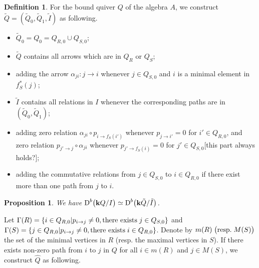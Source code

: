 \documentclass[a4paper, reqno]{amsart}
\newtheorem{prop}[thm]{Proposition}
\theoremstyle{definition}
\newtheorem{defn}[thm]{Definition}
\theoremstyle{remark}
\numberwithin{equation}{section}
\begin{document}
\begin{defn}\label{Def210}
For the bound quiver $Q$ of the algebra $A$, we construct $\tilde{Q}=(\tilde{Q}_0,\tilde{Q}_1,\tilde{I})$ as following.
\begin{itemize}
    \item $\tilde{Q}_0=Q_0=Q_{R,0}\cup Q_{S,0}$;
    \item $\tilde{Q}$ contains all arrows which are in $Q_R$ or $Q_S$;
    \item adding the arrow $\alpha_{ji} : j \to i $ whenever $j\in Q_{S,0}$ and $i$ is a minimal element in $f_S^{*}(j)$; 
    \item $\tilde{I}$ contains all relations in $I$ whenever the corresponding paths are in $(\tilde{Q}_0,\tilde{Q}_1)$;
    \item adding zero relation $\alpha_{ji}\circ p_{i\to f_S(i')}$ whenever $p_{j\to i'}=0$ for $i' \in Q_{R,0}$, and zero relation $p_{j'\to j}\circ\alpha_{ji}$ whenever $p_{j'\to f_S(i)}=0$ for $j'\in Q_{S,0}${\color{red}[this part always holds?]}; 
    \item adding the commutative relations from $j\in Q_{S,0}$ to $i\in Q_{R,0}$ if there exist more than one path from $j$ to $i$.
\end{itemize}
\end{defn}

\begin{prop} \label{210}
We have $\textup{D}^b\big({\bf k} Q/I\big)\simeq \textup{D}^b\big({\bf k} \tilde{Q}/\tilde{I}\big)$. 
\end{prop}

Let $\Gamma(R) = \{i\in Q_{R,0}|p_{i\to j}\neq 0, \textup{there exists}\;j\in Q_{S,0}\}$ and $\Gamma(S) = \{j\in Q_{R,0}|p_{i\to j}\neq 0, \textup{there exists}\;i\in Q_{R,0}\}$. Denote by $m(R)\;\big(\textup{resp.}\;M(S)\big)$ the set of the minimal vertices in $R$ (resp. the maximal vertices in $S$). If there exists non-zero path from $i$ to $j$ in $Q$ for all $i\in m(R)$ and $j\in M(S)$, we construct $\widehat{Q}$ as following.
\end{document}
